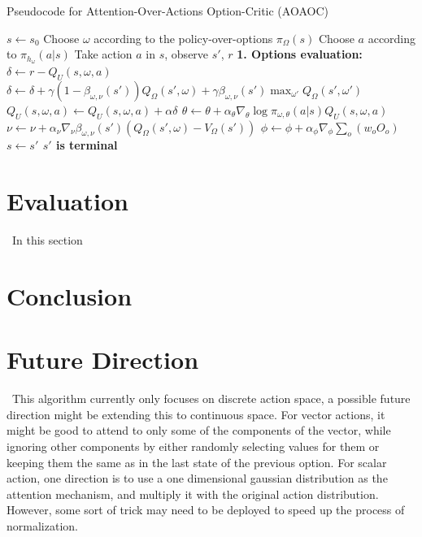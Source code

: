 \documentclass{article}
\begin{document}
	\begin{algorithm}[H]
	\caption{Pseudocode for Attention-Over-Actions Option-Critic (AOAOC)}
	\begin{algorithmic}
		\vspace{1.5mm}
		\State $s \leftarrow s_0$
		\State Choose $\omega$ according to the policy-over-options $\pi_\Omega(s)$
		\Repeat
		\State Choose $a$ according to $\pi_{h_\omega}(a|s)$
		\State Take action $a$ in $s$, observe $s'$, $r$\vspace{3mm}
		\State \bfseries{1. Options evaluation:}
		\State \normalfont $\delta \leftarrow r - Q_U(s,\omega,a)$
		\State $\delta \leftarrow \delta+\gamma(1-\beta_{\omega,\nu}(s'))Q_\Omega(s',\omega)+\gamma \beta_{\omega,\nu}(s')\max_{\omega'}Q_\Omega(s',\omega')$
		\EndIf
		\State $Q_U(s,\omega,a)\leftarrow Q_U(s,\omega,a) + \alpha \delta$
		\vspace{3mm}
		\State $\theta \leftarrow \theta + \alpha_\theta \nabla_\theta \log \pi_{\omega, \theta}(a|s)Q_U(s,\omega,a)$
		\State $\nu \leftarrow \nu + \alpha_\nu \nabla_\nu \beta_{\omega,\nu}(s')(Q_\Omega(s',\omega)-V_\Omega(s'))$
		\State \normalfont $\phi \leftarrow \phi + \alpha_\phi \nabla_\phi \sum_{o} (w_o O_o)$
		\EndIf
		\State $s \leftarrow s'$
		\Until $s'$ is terminal	
	\end{algorithmic}
	\end{algorithm}
	\section{Evaluation}
	\qquad \ In this section
	\section{Conclusion}
	\section{Future Direction}
	\qquad \ This algorithm currently only focuses on discrete action space, a possible future direction might be extending this to continuous space. For vector actions, it might be good to attend to only some of the components of the vector, while ignoring other components by either randomly selecting values for them or keeping them the same as in the last state of the previous option. For scalar action, one direction is to use a one dimensional gaussian distribution as the attention mechanism, and multiply it with the original action distribution. However, some sort of trick may need to be deployed to speed up the process of normalization.
\end{document}

